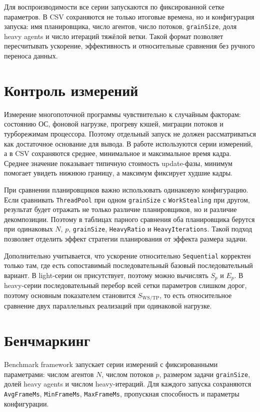 \documentclass[14pt,a4paper,oneside]{extreport}
\begin{document}
Для воспроизводимости все серии запускаются по фиксированной сетке параметров. В CSV сохраняются не только итоговые времена, но и конфигурация запуска: имя планировщика, число агентов, число потоков, \texttt{grainSize}, доля heavy agents и число итераций тяжёлой ветки. Такой формат позволяет пересчитывать ускорение, эффективность и относительные сравнения без ручного переноса данных.

\section{Контроль измерений}

Измерение многопоточной программы чувствительно к случайным факторам: состоянию ОС, фоновой нагрузке, прогреву кэшей, миграции потоков и турборежимам процессора. Поэтому отдельный запуск не должен рассматриваться как достаточное основание для вывода. В работе используются серии измерений, а в CSV сохраняются среднее, минимальное и максимальное время кадра. Среднее значение показывает типичную стоимость update-фазы, минимум помогает увидеть нижнюю границу, а максимум фиксирует худшие кадры.

При сравнении планировщиков важно использовать одинаковую конфигурацию. Если сравнивать \texttt{ThreadPool} при одном \texttt{grainSize} с \texttt{WorkStealing} при другом, результат будет отражать не только различие планировщиков, но и различие декомпозиции. Поэтому в таблицах парного сравнения оба планировщика берутся при одинаковых \(N\), \(p\), \texttt{grainSize}, \texttt{HeavyRatio} и \texttt{HeavyIterations}. Такой подход позволяет отделить эффект стратегии планирования от эффекта размера задачи.

Дополнительно учитывается, что ускорение относительно \texttt{Sequential} корректен только там, где есть сопоставимый последовательный базовый последовательный вариант. В light-серии он присутствует, поэтому можно вычислять \(S_p\) и \(E_p\). В heavy-серии последовательный перебор всей сетки параметров слишком дорог, поэтому основным показателем становится \(S_{\mathrm{WS/TP}}\), то есть относительное сравнение двух параллельных реализаций при одинаковой нагрузке.

\section{Бенчмаркинг}

Benchmark framework запускает серии измерений с фиксированными параметрами: числом агентов \(N\), числом потоков \(p\), размером задачи \texttt{grainSize}, долей heavy agents и числом heavy-итераций. Для каждого запуска сохраняются \texttt{AvgFrameMs}, \texttt{MinFrameMs}, \texttt{MaxFrameMs}, пропускная способность и параметры конфигурации.
\end{document}
